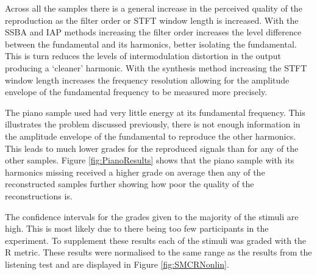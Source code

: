 	Across all the samples there is a general increase in the perceived quality of the reproduction as the filter order
	or STFT window length is increased. With the SSBA and IAP methods increasing the filter order increases the level
	difference between the fundamental and its harmonics, better isolating the fundamental.  This is turn reduces the
	levels of intermodulation distortion in the output producing a `cleaner' harmonic.  With the synthesis method
	increasing the STFT window length increases the frequency resolution allowing for the amplitude envelope of the
	fundamental frequency to be measured more precisely.

	The piano sample used had very little energy at its fundamental frequency. This illustrates the problem discussed
	previously, there is not enough information in the amplitude envelope of the fundamental to reproduce the other
	harmonics. This leads to much lower grades for the reproduced signals than for any of the other samples. Figure
	\ref{fig:PianoResults} shows that the piano sample with its harmonics missing received a higher grade on average
	then any of the reconstructed samples further showing how poor the quality of the reconstructions is.

	The confidence intervals for the grades given to the majority of the stimuli are high. This is most likely due to
	there being too few participants in the experiment. To supplement these results each of the stimuli was graded with
	the R metric. These results were normalised to the same range as the results from the listening test and
	are displayed in Figure \ref{fig:SMCRNonlin}.

